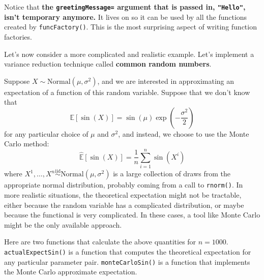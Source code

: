 \documentclass[12pt,krantz2]{krantz}
\begin{document}
Notice that \textbf{the \texttt{greetingMessage=} argument that is passed in, \texttt{"Hello"}, isn't temporary anymore.} It lives on so it can be used by all the functions created by \texttt{funcFactory()}. This is the most surprising aspect of writing function factories.

Let's now consider a more complicated and realistic example. Let's implement a variance reduction technique called \textbf{common random numbers}.

Suppose \(X \sim \text{Normal}(\mu, \sigma^2)\), and we are interested in approximating an expectation of a function of this random variable. Suppose that we don't know that
\begin{equation} 
\mathbb{E}[\sin(X)] = \sin(\mu) \exp\left(-\frac{\sigma^2}{2}\right)
\end{equation}
for any particular choice of \(\mu\) and \(\sigma^2\), and instead, we choose to use the Monte Carlo method:
\begin{equation} 
\hat{\mathbb{E}}[\sin(X)] = \frac{1}{n}\sum_{i=1}^n\sin(X^i)
\end{equation}
where \(X^1, \ldots, X^n \overset{\text{iid}}{\sim} \text{Normal}(\mu, \sigma^2)\) is a large collection of draws from the appropriate normal distribution, probably coming from a call to \texttt{rnorm()}. In more realistic situations, the theoretical expectation might not be tractable, either because the random variable has a complicated distribution, or maybe because the functional is very complicated. In these cases, a tool like Monte Carlo might be the only available approach.

Here are two functions that calculate the above quantities for \(n=1000\). \texttt{actualExpectSin()} is a function that computes the theoretical expectation for any particular parameter pair. \texttt{monteCarloSin()} is a function that implements the Monte Carlo approximate expectation.
\end{document}

